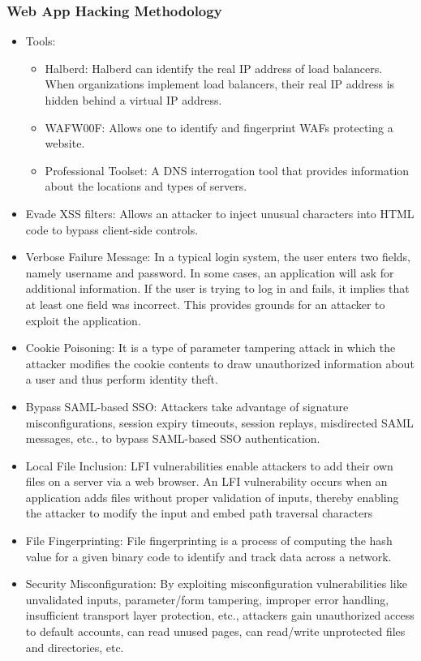 \subsubsection{Web App Hacking Methodology}
\begin{itemize}
    \item Tools:
    \begin{itemize}
        \item Halberd: Halberd can identify the real IP address of load balancers. When organizations implement load balancers, their real IP address is hidden behind a virtual IP address.
        \item WAFW00F: Allows one to identify and fingerprint WAFs protecting a website.
        \item Professional Toolset: A DNS interrogation tool that provides information about the locations and types of servers. 
    \end{itemize}
    \item Evade XSS filters: Allows an attacker to inject unusual characters into HTML code to bypass client-side controls.
    \item Verbose Failure Message: In a typical login system, the user enters two fields, namely username and password. In some cases, an application will ask for additional information. If the user is trying to log in and fails, it implies that at least one field was incorrect. This provides grounds for an attacker to exploit the application.
    \item Cookie Poisoning: It is a type of parameter tampering attack in which the attacker modifies the cookie contents to draw unauthorized information about a user and thus perform identity theft.
    \item Bypass SAML-based SSO: Attackers take advantage of signature misconfigurations, session expiry timeouts, session replays, misdirected SAML messages, etc., to bypass SAML-based SSO authentication.
    \item Local File Inclusion: LFI vulnerabilities enable attackers to add their own files on a server via a web browser. An LFI vulnerability occurs when an application adds files without proper validation of inputs, thereby enabling the attacker to modify the input and embed path traversal characters
    \item File Fingerprinting: File fingerprinting is a process of computing the hash value for a given binary code to identify and track data across a network.
    \item Security Misconfiguration: By exploiting misconfiguration vulnerabilities like unvalidated inputs, parameter/form tampering, improper error handling, insufficient transport layer protection, etc., attackers gain unauthorized access to default accounts, can read unused pages, can read/write unprotected files and directories, etc.

\end{itemize}
